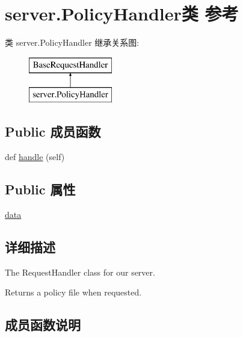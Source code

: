 \hypertarget{classserver_1_1_policy_handler}{}\section{server.\+Policy\+Handler类 参考}
\label{classserver_1_1_policy_handler}
类 server.\+Policy\+Handler 继承关系图\+:\begin{figure}[H]
\begin{center}
\leavevmode
\includegraphics[height=2.000000cm]{classserver_1_1_policy_handler}
\end{center}
\end{figure}
\subsection*{Public 成员函数}
\begin{DoxyCompactItemize}
\item 
def \mbox{\hyperlink{classserver_1_1_policy_handler_a7f604a5748ad0298b526dad7447d284b}{handle}} (self)
\end{DoxyCompactItemize}
\subsection*{Public 属性}
\begin{DoxyCompactItemize}
\item 
\mbox{\hyperlink{classserver_1_1_policy_handler_a84891878fb9dafca204a1762b43cf809}{data}}
\end{DoxyCompactItemize}


\subsection{详细描述}
\begin{DoxyVerb}The RequestHandler class for our server.

Returns a policy file when requested.
\end{DoxyVerb}
 

\subsection{成员函数说明}
\mbox{\label{classserver_1_1_policy_handler_a7f604a5748ad0298b526dad7447d284b}} 
